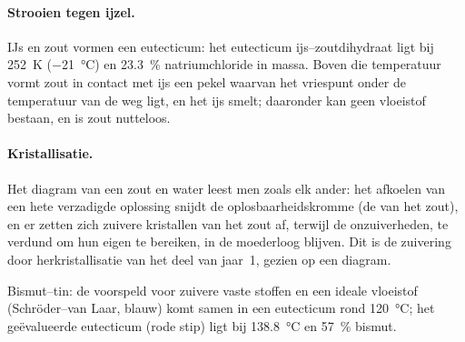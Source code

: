 \paragraph{Strooien tegen ijzel.} IJs en zout vormen een eutecticum: het eutecticum
ijs--zoutdihydraat ligt bij \qty{252}{K} (\qty{-21}{\degreeCelsius}) en 23.3~\% natriumchloride
in massa. Boven die temperatuur vormt zout in contact met ijs een
pekel waarvan het vriespunt onder de temperatuur van de weg ligt, en het ijs
smelt; daaronder kan geen vloeistof bestaan, en is zout nutteloos.

\paragraph{Kristallisatie.} Het diagram van een zout en water leest men zoals elk
ander: het afkoelen van een hete verzadigde oplossing snijdt de oplosbaarheidskromme (de
 van het zout), en er zetten zich zuivere kristallen van het zout af, terwijl de
onzuiverheden, te verdund om hun eigen  te bereiken, in de moederloog blijven.
Dit is de zuivering door herkristallisatie van het deel van jaar~1, gezien op een
diagram.

\begin{omfigure}

{\small Bismut--tin: de  voorspeld voor zuivere vaste stoffen en een ideale
vloeistof (Schröder--van Laar, blauw) komt samen in een eutecticum rond
\qty{120}{\degreeCelsius}; het geëvalueerde eutecticum (rode stip) ligt bij
\qty{138.8}{\degreeCelsius} en 57~\% bismut.}
\end{omfigure}

